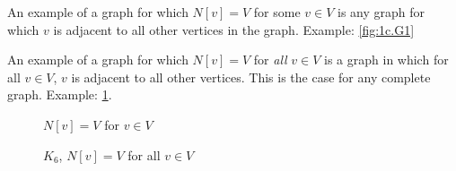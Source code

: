 \documentclass[11pt, letterpaper, includehead]{article}
\theoremstyle{plain}
\theoremstyle{mydefinition}
\theoremstyle{myproperty}
\begin{document}
\begin{enumerate}[label=\textbf{\arabic*}., leftmargin=*]
\begin{enumerate}[label=(\alph*)]
        An example of a graph for which $N[v] = V$ for some $v \in V$ is any graph for which $v$ is adjacent to all other vertices in the graph. Example: \ref{fig:1c.G1}

        An example of a graph for which $N[v] = V$ for \emph{all} $v \in V$ is a graph in which for all $v \in V$, $v$ is adjacent to all other vertices. This is the case for any complete graph. Example: \ref{fig:1c.K6}.

        \begin{figure}[H]
            \centering
        
            \begin{minipage}[t]{0.45\textwidth}
                \centering
                \caption{$N[v] = V$ for $v \in V$}
                \label{fig:1c.G1}
            \end{minipage}
            \hfill
            \begin{minipage}[t]{0.45\textwidth}
                \centering
                \caption{$K_6$, $N[v] = V$ for all $v \in V$}
                \label{fig:1c.K6}
            \end{minipage}
        \end{figure}
        

\end{enumerate}
\end{enumerate}
\end{document}
